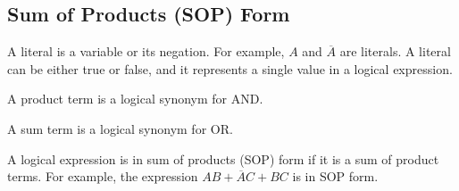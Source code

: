\documentclass[11pt]{report}
\begin{document}
\subsection{Sum of Products (SOP) Form}
\begin{definition}[Literal]
    A literal is a variable or its negation. For example, $A$ and $\overline{A}$ are literals.  A literal can be either true or false, and it represents a single value in a logical expression.

\end{definition}

\begin{definition}
    A product term is a logical synonym for AND.
\end{definition}

\begin{definition}
    A sum term is a logical synonym for OR.
\end{definition}

\begin{definition}
    A logical expression is in sum of products (SOP) form if it is a sum of product terms. For example, the expression $AB + \overline{A}C + BC$ is in SOP form.
\end{definition}
\end{document}
